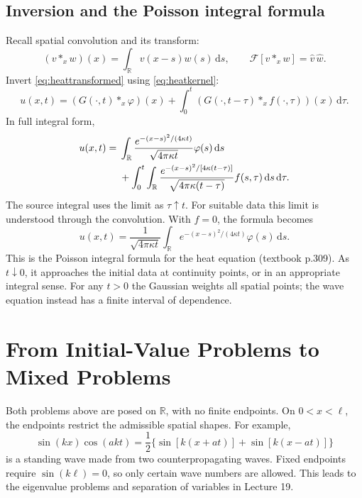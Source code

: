\documentclass[11pt,a4paper]{article}
\newcommand{\dd}{\,\mathrm{d}}
\newcommand{\R}{\mathbb{R}}
\begin{document}
\subsection{Inversion and the Poisson integral formula}
Recall spatial convolution and its transform:
\begin{equation}
 (v*_x w)(x)=\int_\R v(x-s)w(s)\dd s,\qquad
 \mathcal F[v*_x w]=\widehat v\,\widehat w.
\end{equation}
Invert \eqref{eq:heattransformed} using \eqref{eq:heatkernel}:
\begin{equation}
 u(x,t)=(G(\cdot,t)*_x\varphi)(x)
       +\int_0^t(G(\cdot,t-\tau)*_x f(\cdot,\tau))(x)\dd\tau.
\end{equation}
In full integral form,
\begin{align}
 u(x,t)={}&\int_\R\frac{e^{-(x-s)^2/(4\kappa t)}}{\sqrt{4\pi\kappa t}}
                  \varphi(s)\dd s\notag\\
 &+\int_0^t\int_\R
  \frac{e^{-(x-s)^2/[4\kappa(t-\tau)]}}{\sqrt{4\pi\kappa(t-\tau)}}
                  f(s,\tau)\dd s\dd\tau.
\end{align}
The source integral uses the limit as $\tau\uparrow t$. For suitable data this
limit is understood through the convolution. With $f=0$, the formula becomes
\begin{equation}
 \boxed{u(x,t)=\frac1{\sqrt{4\pi\kappa t}}\int_\R
              e^{-(x-s)^2/(4\kappa t)}\varphi(s)\dd s.}
\end{equation}
This is the Poisson integral formula for the heat equation (textbook p.309).
As $t\downarrow0$, it approaches the initial data at continuity points, or in an
appropriate integral sense. For any $t>0$ the Gaussian weights all spatial points;
the wave equation instead has a finite interval of dependence.

\section*{From Initial-Value Problems to Mixed Problems}
Both problems above are posed on $\R$, with no finite endpoints. On $0<x<\ell$,
the endpoints restrict the admissible spatial shapes. For example,
\begin{equation}
 \sin(kx)\cos(akt)=\frac12\{\sin[k(x+at)]+\sin[k(x-at)]\}
\end{equation}
is a standing wave made from two counterpropagating waves. Fixed endpoints require
$\sin(k\ell)=0$, so only certain wave numbers are allowed. This leads to the
eigenvalue problems and separation of variables in Lecture 19.
\end{document}
